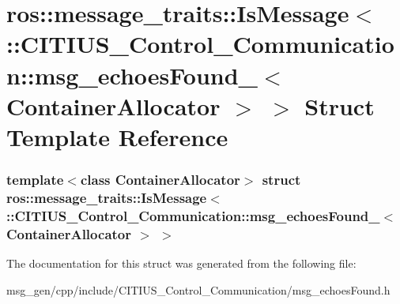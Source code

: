\hypertarget{structros_1_1message__traits_1_1_is_message_3_01_1_1_c_i_t_i_u_s___control___communication_1_1msfae6dc34c12e2903721999b9ec7aef32}{\section{ros\-:\-:message\-\_\-traits\-:\-:\-Is\-Message$<$ \-:\-:\-C\-I\-T\-I\-U\-S\-\_\-\-Control\-\_\-\-Communication\-:\-:msg\-\_\-echoes\-Found\-\_\-$<$ \-Container\-Allocator $>$ $>$ \-Struct \-Template \-Reference}
\label{structros_1_1message__traits_1_1_is_message_3_01_1_1_c_i_t_i_u_s___control___communication_1_1msfae6dc34c12e2903721999b9ec7aef32}
}
\subsubsection*{template$<$class Container\-Allocator$>$ struct ros\-::message\-\_\-traits\-::\-Is\-Message$<$ \-::\-C\-I\-T\-I\-U\-S\-\_\-\-Control\-\_\-\-Communication\-::msg\-\_\-echoes\-Found\-\_\-$<$ Container\-Allocator $>$ $>$}



\-The documentation for this struct was generated from the following file\-:\begin{DoxyCompactItemize}
\item 
msg\-\_\-gen/cpp/include/\-C\-I\-T\-I\-U\-S\-\_\-\-Control\-\_\-\-Communication/msg\-\_\-echoes\-Found.\-h\end{DoxyCompactItemize}
